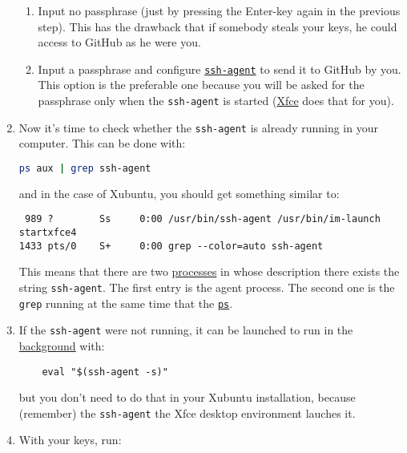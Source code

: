 \begin{enumerate}
  \begin{enumerate}
  \item Input no passphrase (just by pressing the Enter-key again in
    the previous step). This has the drawback that if somebody steals
    your keys, he could access to GitHub as he were you.
  \item Input a passphrase and configure
    \href{https://www.ssh.com/ssh/agent}{\texttt{ssh-agent}} to send
    it to GitHub by you. This option is the preferable one because you
    will be asked for the passphrase only when the \texttt{ssh-agent}
    is started (\href{https://www.xfce.org/}{Xfce} does that for you).
  \end{enumerate}

\item Now it's time to check whether the \texttt{ssh-agent} is already
  running in your computer. This can be done with:

  \begin{lstlisting}[language=bash]
    ps aux | grep ssh-agent
  \end{lstlisting}

  and in the case of Xubuntu, you should get something similar to:

\begin{verbatim}
 989 ?        Ss     0:00 /usr/bin/ssh-agent /usr/bin/im-launch startxfce4
1433 pts/0    S+     0:00 grep --color=auto ssh-agent
\end{verbatim}

  This means that there are two
  \href{https://en.wikipedia.org/wiki/Process_(computing)}{processes}
  in whose description there exists the string \texttt{ssh-agent}. The
  first entry is the agent process. The second one is the
  \texttt{grep} running at the same time that the
  \href{https://man7.org/linux/man-pages/man1/ps.1.html}{\texttt{ps}}.

\item If the \texttt{ssh-agent} were not running, it can be launched
  to run in
  the \href{https://en.wikipedia.org/wiki/Background_process}{background}
  with:

  \begin{verbatim}
    eval "$(ssh-agent -s)"
  \end{verbatim}

  but you don't need to do that in your Xubuntu installation, because
  (remember) the \texttt{ssh-agent} the
  Xfce desktop environment lauches it.

\item With your keys, run:


\end{enumerate}
